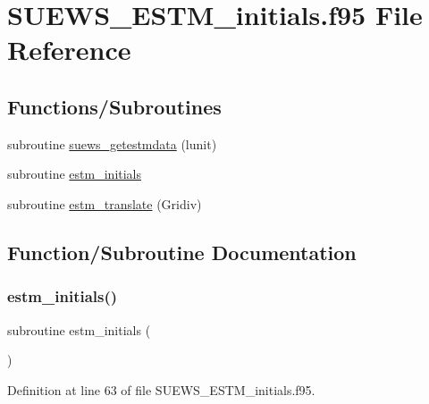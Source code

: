 \hypertarget{_s_u_e_w_s___e_s_t_m__initials_8f95}{}\section{S\+U\+E\+W\+S\+\_\+\+E\+S\+T\+M\+\_\+initials.\+f95 File Reference}
\label{_s_u_e_w_s___e_s_t_m__initials_8f95}
\subsection*{Functions/\+Subroutines}
\begin{DoxyCompactItemize}
\item 
subroutine \hyperlink{_s_u_e_w_s___e_s_t_m__initials_8f95_afc2c99adf0020c7992fb803d9d9f1c45}{suews\+\_\+getestmdata} (lunit)
\item 
subroutine \hyperlink{_s_u_e_w_s___e_s_t_m__initials_8f95_a749f9226b64e6390fb32175d58ca1d1a}{estm\+\_\+initials}
\item 
subroutine \hyperlink{_s_u_e_w_s___e_s_t_m__initials_8f95_a64bd0feca17210d10f1019b759141cfb}{estm\+\_\+translate} (Gridiv)
\end{DoxyCompactItemize}


\subsection{Function/\+Subroutine Documentation}
\mbox{\label{_s_u_e_w_s___e_s_t_m__initials_8f95_a749f9226b64e6390fb32175d58ca1d1a}} 
\subsubsection{\texorpdfstring{estm\+\_\+initials()}{estm\_initials()}}
{\footnotesize\ttfamily subroutine estm\+\_\+initials (\begin{DoxyParamCaption}{ }\end{DoxyParamCaption})}



Definition at line 63 of file S\+U\+E\+W\+S\+\_\+\+E\+S\+T\+M\+\_\+initials.\+f95.

